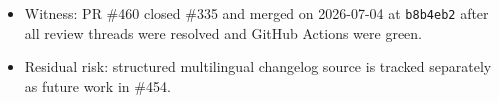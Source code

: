 \begin{itemize}
  Replay: \texttt{n\allowbreak{}p\allowbreak{}m\allowbreak{} \allowbreak{}t\allowbreak{}e\allowbreak{}s\allowbreak{}t\allowbreak{} \allowbreak{}-\allowbreak{}-\allowbreak{} \allowbreak{}-\allowbreak{}-\allowbreak{}r\allowbreak{}u\allowbreak{}n\allowbreak{} \allowbreak{}t\allowbreak{}e\allowbreak{}s\allowbreak{}t\allowbreak{}s\allowbreak{}/\allowbreak{}c\allowbreak{}y\allowbreak{}c\allowbreak{}l\allowbreak{}e\allowbreak{}s\allowbreak{}/\allowbreak{}D\allowbreak{}F\allowbreak{}-\allowbreak{}0\allowbreak{}2\allowbreak{}3\allowbreak{}/\allowbreak{}p\allowbreak{}u\allowbreak{}b\allowbreak{}l\allowbreak{}i\allowbreak{}s\allowbreak{}h\allowbreak{}-\allowbreak{}r\allowbreak{}e\allowbreak{}p\allowbreak{}o\allowbreak{}-\allowbreak{}p\allowbreak{}a\allowbreak{}c\allowbreak{}k\allowbreak{}a\allowbreak{}g\allowbreak{}e\allowbreak{}-\allowbreak{}a\allowbreak{}n\allowbreak{}d\allowbreak{}-\allowbreak{}r\allowbreak{}e\allowbreak{}l\allowbreak{}e\allowbreak{}a\allowbreak{}s\allowbreak{}e\allowbreak{}-\allowbreak{}g\allowbreak{}u\allowbreak{}i\allowbreak{}d\allowbreak{}e\allowbreak{}s\allowbreak{}-\allowbreak{}i\allowbreak{}n\allowbreak{}-\allowbreak{}d\allowbreak{}o\allowbreak{}g\allowbreak{}f\allowbreak{}o\allowbreak{}o\allowbreak{}d\allowbreak{}.\allowbreak{}t\allowbreak{}e\allowbreak{}s\allowbreak{}t\allowbreak{}.\allowbreak{}t\allowbreak{}s\allowbreak{} \allowbreak{}t\allowbreak{}e\allowbreak{}s\allowbreak{}t\allowbreak{}s\allowbreak{}/\allowbreak{}c\allowbreak{}y\allowbreak{}c\allowbreak{}l\allowbreak{}e\allowbreak{}s\allowbreak{}/\allowbreak{}W\allowbreak{}F\allowbreak{}-\allowbreak{}1\allowbreak{}3\allowbreak{}0\allowbreak{}/\allowbreak{}r\allowbreak{}o\allowbreak{}a\allowbreak{}d\allowbreak{}m\allowbreak{}a\allowbreak{}p\allowbreak{}-\allowbreak{}g\allowbreak{}o\allowbreak{}a\allowbreak{}l\allowbreak{}p\allowbreak{}o\allowbreak{}s\allowbreak{}t\allowbreak{}-\allowbreak{}p\allowbreak{}o\allowbreak{}l\allowbreak{}i\allowbreak{}c\allowbreak{}y\allowbreak{}.\allowbreak{}p\allowbreak{}a\allowbreak{}r\allowbreak{}t\allowbreak{}0\allowbreak{}1\allowbreak{}.\allowbreak{}t\allowbreak{}e\allowbreak{}s\allowbreak{}t\allowbreak{}.\allowbreak{}t\allowbreak{}s}.
\item
  Witness: PR \#460 closed \#335 and merged on 2026-07-04 at \texttt{b\allowbreak{}8\allowbreak{}b\allowbreak{}4\allowbreak{}e\allowbreak{}b\allowbreak{}2} after all review threads were resolved and GitHub Actions were green.
\item
  Residual risk: structured multilingual changelog source is tracked separately as future work in \#454.
\end{itemize}

